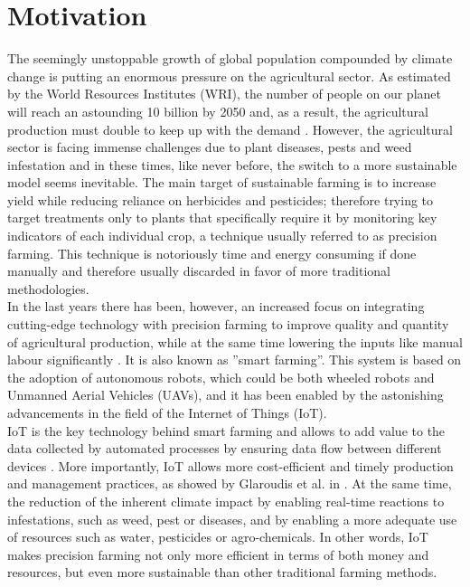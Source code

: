 \chapter{Motivation}
The seemingly unstoppable growth of global population compounded by climate change is putting an enormous pressure on the agricultural sector. As estimated by the World Resources Institutes (WRI), the number of people on our planet will reach an astounding 10 billion by 2050  \cite{ayaz_internet--things_2019} and, as a result, the agricultural production must double to keep up with the demand \cite{singh_machine_2016}. However, the agricultural sector is facing immense challenges due to plant diseases, pests and weed infestation and in these times, like never before, the switch to a more sustainable model seems inevitable. The main target of sustainable farming is to increase yield while reducing reliance on herbicides and pesticides; therefore trying to target treatments only to plants that specifically require it by monitoring key indicators of each individual crop, a technique usually referred to as precision farming. This technique is notoriously time and energy consuming if done manually and therefore usually discarded in favor of more traditional methodologies. \cite{lottes_effective_2016}\\
In the last years there has been, however, an increased focus on integrating cutting-edge technology with precision farming to improve quality and quantity of agricultural production, while at the same time lowering the inputs like manual labour significantly \cite{islam_review_2021}.  It is also known as ''smart farming''.  This system is based on the adoption of autonomous robots, which could be both wheeled robots and Unmanned Aerial Vehicles (UAVs), and it has been enabled by the astonishing advancements in the field of the Internet of Things (IoT). \\
IoT is the key technology behind smart farming and allows to add value to the data collected by automated processes by ensuring data flow between different devices  \cite{islam_review_2021}.  More importantly, IoT allows more cost-efficient and timely production and management practices, as showed by  Glaroudis et al. in \cite{glaroudis_survey_2020}. At the same time, the reduction of the inherent climate impact by enabling real-time reactions to infestations,  such as weed, pest or diseases, and by enabling a more adequate use of resources such as water, pesticides or agro-chemicals. \cite{islam_review_2021}
In other words, IoT makes precision farming not only more efficient in terms of both money and resources, but even more sustainable than other traditional farming methods. \\
